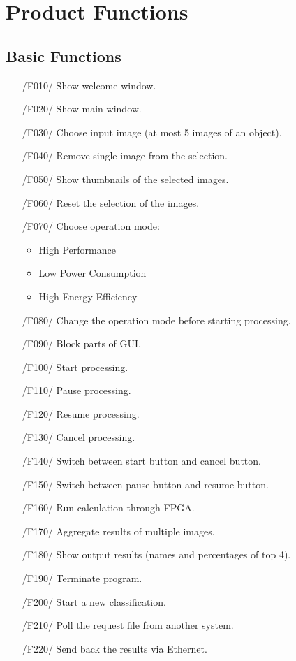 \documentclass[parskip=full]{scrartcl}
\begin{document}
\pagebreak





\section{Product Functions} \label {pfunc}

\subsection{Basic Functions} \label {bfunc}

\begin{itemize}
	\item[/F010/] Show welcome window.
	\item[/F020/] Show main window. 
	\item[/F030/] Choose input image (at most 5 images of an object).
	\item[/F040/] Remove single image from the selection.
	\item[/F050/] Show thumbnails of the selected images.
	\item[/F060/] Reset the selection of the images.
	\item[/F070/] Choose operation mode: 
	\begin{itemize}
		\item High Performance
		\item Low Power Consumption
		\item High Energy Efficiency
	\end{itemize}
	\item[/F080/] Change the operation mode before starting processing.
	\item[/F090/] Block parts of GUI.
	\item[/F100/] Start processing.
	\item[/F110/] Pause processing.
	\item[/F120/] Resume processing.
	\item[/F130/] Cancel processing.
	\item[/F140/] Switch between start button and cancel button.
	\item[/F150/] Switch between pause button and resume button.
	\item[/F160/] Run calculation through FPGA.
	\item[/F170/] Aggregate results of multiple images.
	\item[/F180/] Show output results (names and percentages of top 4).
	\item[/F190/] Terminate program.
	\item[/F200/] Start a new classification.
	\item[/F210/] Poll the request file from another system.
	\item[/F220/] Send back the results via Ethernet.
\end{itemize}
\end{document}
